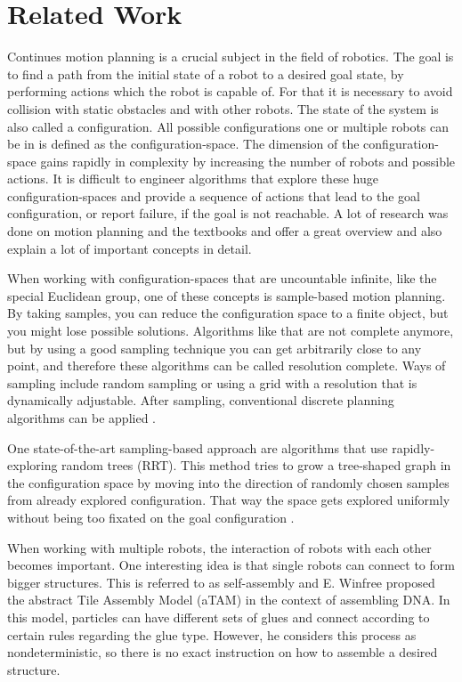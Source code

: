 \section{Related Work}

Continues motion planning is a crucial subject in the field of robotics.
The goal is to find a path from the initial state of a robot to a desired goal state, by performing actions which the robot is capable of.
For that it is necessary to avoid collision with static obstacles and with other robots.
The state of the system is also called a configuration.
All possible configurations one or multiple robots can be in is defined as the configuration-space.
The dimension of the configuration-space gains rapidly in complexity by increasing the number of robots and possible actions.
It is difficult to engineer algorithms that explore these huge configuration-spaces and provide a sequence of actions that lead to the goal configuration, or report failure, if the goal is not reachable.
A lot of research was done on motion planning and the textbooks \cite{LaValle2006} and \cite{Mueller2019} offer a great overview and also explain a lot of important concepts in detail.

When working with configuration-spaces that are uncountable infinite, like the special Euclidean group, one of these concepts is sample-based motion planning.
By taking samples, you can reduce the configuration space to a finite object, but you might lose possible solutions.
Algorithms like that are not complete anymore, but by using a good sampling technique you can get arbitrarily close to any point, and therefore these algorithms can be called resolution complete.
Ways of sampling include random sampling or using a grid with a resolution that is dynamically adjustable.
After sampling, conventional discrete planning algorithms can be applied \cite{LaValle2006}.

One state-of-the-art sampling-based approach are algorithms that use rapidly-exploring random trees (RRT).
This method tries to grow a tree-shaped graph in the configuration space by moving into the direction of randomly chosen samples from already explored configuration. That way the space gets explored uniformly without being too fixated on the goal configuration \cite{lavalle1998,lavalle2001}.

When working with multiple robots, the interaction of robots with each other becomes important.
One interesting idea is that single robots can connect to form bigger structures.
This is referred to as self-assembly and E. Winfree \cite{winfree1998} proposed the abstract Tile Assembly Model (aTAM) in the context of assembling DNA.
In this model, particles can have different sets of glues and connect according to certain rules regarding the glue type.
However, he considers this process as nondeterministic, so there is no exact instruction on how to assemble a desired structure.

